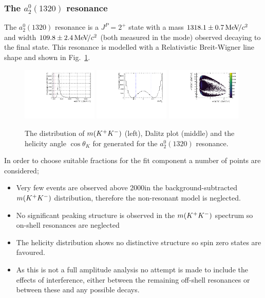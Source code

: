 \subsubsection{The $a_{2}^{0}(1320)$ resonance}
The $a_{2}^{0}(1320)$ resonance is a $J^{P} = 2^{+}$ state with a mass $1318.1\pm0.7{\mathrm{\,Me\kern -0.1em V\!/}c^2}$ and width $109.8\pm2.4{\mathrm{\,Me\kern -0.1em V\!/}c^2}$ (both measured in the \kaon\Kb mode) observed decaying to the \kaon\Kb final state. This resonance is modelled with a Relativistic Breit-Wigner line shape and shown in Fig.~\ref{fig:DsKK_model_a21320}.
\begin{figure}[!h]
   \centering   
   \includegraphics[width=0.32\textwidth]{figs/B2DsPhi/a2_1320_phi_mass.pdf}
   \includegraphics[width=0.32\textwidth]{figs/B2DsPhi/a2_1320_Helicity.pdf}
   \includegraphics[width=0.32\textwidth]{figs/B2DsPhi/a2_1320_Dalitz_plot.pdf}
   \caption{The distribution of $m({{K}^+}{{K}^-})$ (left), Dalitz plot (middle) and the helicity angle $\cos\theta_{K}$ for generated for the $a_{2}^{0}(1320)$ resonance.} 
   \label{fig:DsKK_model_a21320}   
\end{figure}


In order to choose suitable fractions for the \decay{\Bp}{\Dsp\Kp\Km} fit component a number of points are considered;

\begin{itemize}
\item Very few events are observed above 2000\mevcc in the background-subtracted $m({{K}^+}{{K}^-})$ distribution, therefore the non-resonant model is neglected.
\item No significant peaking structure is observed in the $m({{K}^+}{{K}^-})$ spectrum so on-shell resonances are neglected
\item The helicity distribution shows no distinctive structure so spin zero states are favoured.  
\item As this is not a full amplitude analysis no attempt is made to include the effects of interference, either between the remaining off-shell resonances or between these and any possible \decay{\Bp}{\Dsp\phiz} decays.
\end{itemize}

